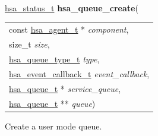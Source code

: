 \documentclass[final]{book}
\newcommand{\hsaarg}[1]{\textit{#1}}
\begin{document}
\noindent\begin{tcolorbox}[breakable,nobeforeafter,colframe=white,colback=lightgray,left=0mm]
\hyperlink{group__status_1gad755322e7ff95456520e8abdbe90d225}{hsa_status_t} \hypertarget{group__queue_1gad922ac264b223f1ba8779b0705dea163}{\textbf{hsa_queue_create}}(
\vspace{-3.5mm}\begin{longtable}{@{}p{\textwidth}}
\hspace{1.7em}const \hyperlink{group__topology_1gab8db3fb886332a24acac08ec361e1d86}{hsa_agent_t} * \hsaarg{component},\\
\hspace{1.7em}size_t \hsaarg{size},\\
\hspace{1.7em}\hyperlink{group__queue_1gaf1939f228a41fa6ee50cffd4de03b561}{hsa_queue_type_t} \hsaarg{type},\\
\hspace{1.7em}\hyperlink{group__status_1ga8ac33c4e26296b067939e9cbbb25696a}{hsa_event_callback_t} \hsaarg{event_callback},\\
\hspace{1.7em}\hyperlink{group__queue_1gacbb2835331f18aee30ee441f07b3fc5a}{hsa_queue_t} * \hsaarg{service_queue},\\
\hspace{1.7em}\hyperlink{group__queue_1gacbb2835331f18aee30ee441f07b3fc5a}{hsa_queue_t} ** \hsaarg{queue})\end{longtable}

\end{tcolorbox}
Create a user mode queue.
\end{document}
